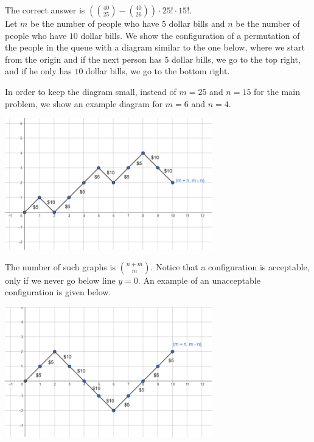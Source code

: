 \begin{solution}
The correct answer is $
(\binom{40 }{25} - \binom{40}{26}) \cdot 25! \cdot 15!$.\\[0.2cm]

Let $m$ be the number of people who have $5$ dollar bills and $n$ be the number of people who have $10$ dollar bills.
We show the configuration of a permutation of the people in the queue with a diagram similar to the one below, where we start from the origin and if the next person has $5$ dollar bills, we go to the top right, and if he only has $10$ dollar bills, we go to the bottom right.

In order to keep the diagram small, instead of $m=25$ and $n=15$ for the main problem,  we show an example diagram for  $m=6$ and $n=4$. 

\begin{center}
	\includegraphics[width=9cm]{26/figs/26_diagram1.png}
\end{center}

The number of such graphs is ${n+m \choose m}$. Notice that a configuration is acceptable, only if we never go below line $y=0$. An example of an unacceptable configuration is given below.

\begin{center}
	\includegraphics[width=9cm]{26/figs/26_diagram2.png}
\end{center}


\end{solution}
